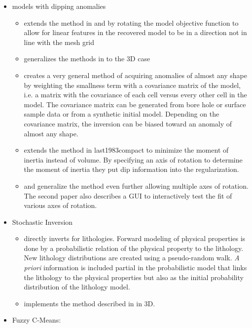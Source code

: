 \begin{itemize}
\begin{itemize}
\end{itemize}
\item models with dipping anomalies
\begin{itemize}
\item \cite{li2000incorporating}  extends the method in \cite{li19963} and \cite{li19983} by rotating the model objective function to allow for linear features in the recovered model to be in a direction not in line with the mesh grid
\item \cite{lelievre2009comprehensive} generalizes the methods in \cite{li2000incorporating} to the 3D case
\item \cite{chasseriau20033d} creates a very general method of acquiring anomalies of almost any shape by weighting the smallness term with a covariance matrix of the model, i.e. a matrix with the covariance of each cell versus every other cell in the model. The covariance matrix can be generated from bore hole or surface sample data or from a synthetic initial model. Depending on the covariance matrix, the inversion can be biased toward an anomaly of almost any shape.
\item \cite{guillen1984gravity} extends the method in {last1983compact} to minimize the moment of inertia instead of volume. By specifying an axis of rotation to determine the moment of inertia they put dip information into the regularization.
\item \cite{barbosa1994generalized} and \cite{barbosa2006interactive} generalize the method even further allowing multiple axes of rotation. The second paper also describes a GUI to interactively test the fit of various axes of rotation.
\end{itemize}
\item Stochastic Inversion
\begin{itemize}
\item \cite{bosch2001lithologic} directly inverts for lithologies. Forward modeling of physical properties is done by a probabilistic relation of the physical property to the lithology. New lithology distributions are created using a pseudo-random walk. \emph{A priori} information is included partial in the probabilistic model that links the lithology to the physical properties but also as the initial probability distribution of the lithology model.
\item \cite{guillen2008geological} implements the method described in \cite{bosch2001lithologic} in 3D.
\end{itemize}
\item Fuzzy C-Means: 

\end{itemize}
